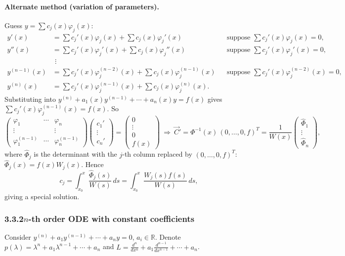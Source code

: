 \documentclass[11pt]{article}
\theoremstyle{definition}
\theoremstyle{remark}
\newcommand{\R}{\mathbb{R}}
\newcommand{\subsecn}[1]{\subsubsection*{#1}}
\begin{document}
\paragraph{Alternate method (variation of parameters).}
Guess $y=\sum c_j(x)\varphi_j(x)$:
\[
\begin{aligned}
y'(x)&=\sum c_j'(x)\varphi_j(x)+\sum c_j(x)\varphi_j'(x) &&\text{suppose } \textstyle\sum c_j'(x)\varphi_j(x)=0,\\
y''(x)&=\sum c_j'(x)\varphi_j'(x)+\sum c_j(x)\varphi_j''(x) &&\text{suppose } \textstyle\sum c_j'(x)\varphi_j'(x)=0,\\
&\ \,\vdots\\
y^{(n-1)}(x)&=\sum c_j'(x)\varphi_j^{(n-2)}(x)+\sum c_j(x)\varphi_j^{(n-1)}(x) &&\text{suppose } \textstyle\sum c_j'(x)\varphi_j^{(n-2)}(x)=0,\\
y^{(n)}(x)&=\sum c_j'(x)\varphi_j^{(n-1)}(x)+\sum c_j(x)\varphi_j^{(n)}(x).
\end{aligned}
\]
Substituting into $y^{(n)}+a_1(x)y^{(n-1)}+\cdots+a_n(x)y=f(x)$ gives
$\sum c_j'(x)\varphi_j^{(n-1)}(x)=f(x)$. So
\[
\begin{pmatrix} \varphi_1 & \cdots & \varphi_n\\ \vdots & & \vdots\\ \varphi_1^{(n-1)} & \cdots & \varphi_n^{(n-1)} \end{pmatrix}
\begin{pmatrix} c_1'\\ \vdots\\ c_n' \end{pmatrix}
=\begin{pmatrix} 0\\ \vdots\\ 0\\ f(x) \end{pmatrix}
\ \Rightarrow\ \vec{C}'=\Phi^{-1}(x)\,(0,\dots,0,f)^T=\frac{1}{W(x)}\begin{pmatrix} \hat{\Phi}_1\\ \vdots\\ \hat{\Phi}_n \end{pmatrix},
\]
where $\hat{\Phi}_j$ is the determinant with the $j$-th column replaced by $(0,\dots,0,f)^T$:
$\hat{\Phi}_j(x)=f(x)W_j(x)$. Hence
\[
c_j=\int_{x_0}^{x}\frac{\hat{\Phi}_j(s)}{W(s)}\,ds=\int_{x_0}^{x}\frac{W_j(s)f(s)}{W(s)}\,ds,
\]
giving a special solution.

\subsecn{3.3.2\quad $n$-th order ODE with constant coefficients}

Consider $y^{(n)}+a_1y^{(n-1)}+\cdots+a_ny=0$, $a_i\in\R$. Denote
$p(\lambda)=\lambda^n+a_1\lambda^{n-1}+\cdots+a_n$ and
$L=\frac{d^n}{dx^n}+a_1\frac{d^{n-1}}{dx^{n-1}}+\cdots+a_n$.
\end{document}
